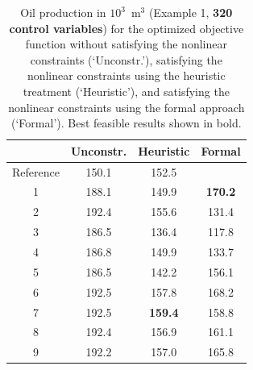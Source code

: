 \documentclass[twocolumn,numbook]{svjour3}          %
\begin{document}
             
\begin{table}
\centering
\caption{Oil production in $10^3$~m$^3$ (Example 1, {\bf 320 control variables}) for the optimized objective function
         without satisfying the nonlinear constraints (`Unconstr.'), satisfying the nonlinear constraints
         using the heuristic treatment (`Heuristic'), and satisfying the nonlinear constraints
         using the formal approach (`Formal'). Best feasible results shown in bold.}
\begin{tabular}{|c|c|c|c|}
\hline
    & Unconstr. & Heuristic & Formal                          \\
\hline
Reference             & 150.1         &  152.5                      &                     \\
1                     & 188.1         &  149.9                      &  \bf{ 170.2 }        \\
2                     & 192.4         &  155.6                      &         131.4            \\
3                     & 186.5         &  136.4                      &         117.8          \\
4                     & 186.8         &  149.9                      &         133.7          \\
5                     & 186.5         &  142.2                      &         156.1          \\
6                     & 192.5         &  157.8                      &         168.2          \\
7                     & 192.5         &  \bf{159.4}               &         158.8          \\ 
8                     & 192.4         &  156.9                      &         161.1          \\
9                     & 192.2         &  157.0                      &         165.8          \\
\hline
\end{tabular}
  \label{table:PiC500Steps64}
\end{table}
 
 
 
 

 



%       
%
%
%
%
%
%
\end{document}
